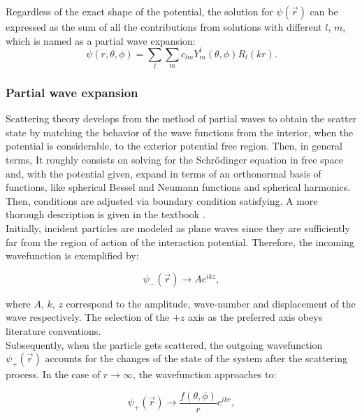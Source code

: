 \documentclass[openany]{book}
\begin{document}
Regardless of the exact shape of the potential, the solution for $\psi(\vec r)$ can be expressed as the sum of all the contributions from solutions with different $l$, $m$, which is named as a partial wave expansion: \\

\begin{equation}   \label{eq:partialWaveExpansion_definition_general}
	\psi(r, \theta, \phi) =  \sum_{l} \sum_{m} {c_{lm}Y_{m}^{l}(\theta, \phi)R_l(kr)}.
\end{equation}

\subsubsection{Partial wave expansion}

Scattering theory develops from the method of partial waves to obtain the scatter state by matching the behavior of the wave functions from the interior, when the potential is considerable, to the exterior potential free region. Then, in general terms, It roughly consists on solving for the Schrödinger equation in free space and, with the potential given, expand in terms of an orthonormal basis of functions, like spherical Bessel and Neumann functions and spherical harmonics. Then, conditions are adjusted via boundary condition satisfying. A more thorough description is given in the textbook \cite{joachain_1975}.  \\

Initially, incident particles are modeled as plane waves since they are sufficiently far from the region of action of the interaction potential. Therefore, the incoming wavefunction is exemplified by: 

\begin{equation} \label{eq:scattering_waveFunction_incident}
	\psi_{-}(\vec r) \rightarrow A e^{ikz}, 
\end{equation}

where $A$, $k$, $z$ correspond to the amplitude, wave-number and displacement of the wave respectively. The selection of the $+z$ axis as the preferred axis obeys literature conventions. \\

Subsequently, when the particle gets scattered, the outgoing wavefunction $\psi_{+}(\vec r)$ accounts for the changes of the state of the system after the scattering process. In the case of $r \rightarrow \infty$, the wavefunction approaches to:

\begin{equation} \label{eq:scattering_waveFunction_outgoing}
	\psi_{+}(\vec r) \rightarrow \frac{f(\theta, \phi)}{r} e^{i k r}, 
\end{equation}
\end{document}
